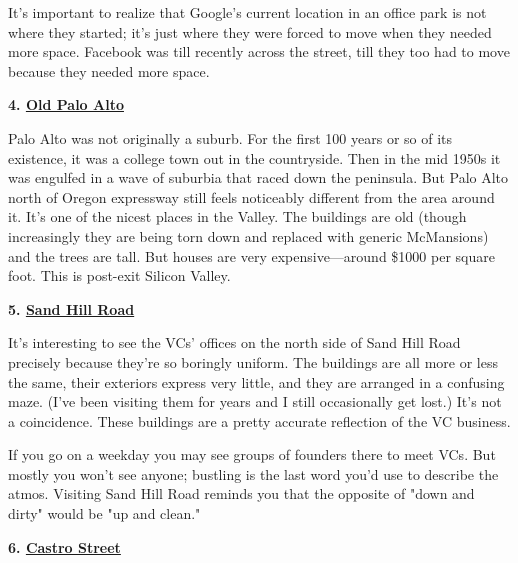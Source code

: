 It's important to realize that
                    Google's current location in an office park is not where
                    they started; it's just where they were forced to move when
                    they needed more space. Facebook was till recently across
                    the street, till they too had to move because they needed
                    more space.

\textbf{4.
                      \href{http://maps.google.com/maps?q=old+palo+alto}{Old Palo Alto}}

Palo Alto was not originally a suburb. For the
                    first 100 years or so of its existence, it was a college
                    town out in the countryside. Then in the mid 1950s it was
                    engulfed in a wave of suburbia that raced down the
                    peninsula. But Palo Alto north of Oregon expressway still
                    feels noticeably different from the area around it. It's one
                    of the nicest places in the Valley. The buildings are old
                    (though increasingly they are being torn down and replaced
                    with generic McMansions) and the trees are tall. But houses
                    are very expensive---around \$1000 per square foot. This
                    is post-exit Silicon Valley.


                    \textbf{5.
                      \href{http://maps.google.com/maps?q=2900+sand+hill+road+menlo+park}{Sand Hill Road}}

It's interesting to see the VCs' offices on the
                    north side of Sand Hill Road precisely because they're so
                    boringly uniform. The buildings are all more or less the
                    same, their exteriors express very little, and they are
                    arranged in a confusing maze. (I've been visiting them for
                    years and I still occasionally get lost.) It's not a
                    coincidence. These buildings are a pretty accurate
                    reflection of the VC business.

If you go on a
                    weekday you may see groups of founders there to meet VCs.
                    But mostly you won't see anyone; bustling is the last word
                    you'd use to describe the atmos. Visiting Sand Hill Road
                    reminds you that the opposite of "down and dirty" would be
                    "up and clean."

\textbf{6.
                      \href{http://maps.google.com/maps?q=castro+and+villa+mountain+view}{Castro Street}}

